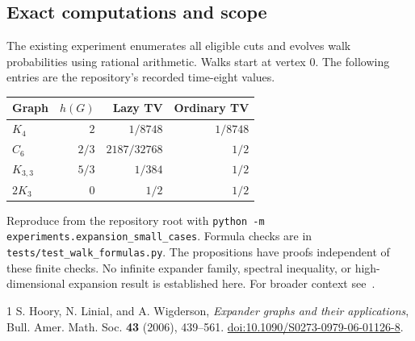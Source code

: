\documentclass[11pt,letterpaper]{article}
\begin{document}
\subsection*{Exact computations and scope}
The existing experiment enumerates all eligible cuts and evolves walk
probabilities using rational arithmetic. Walks start at vertex 0.
The following entries are the repository's recorded time-eight values.
\begin{center}
\begin{tabular}{lrrr}
\toprule
Graph & $h(G)$ & Lazy TV & Ordinary TV\\
\midrule
$K_4$ & $2$ & $1/8748$ & $1/8748$\\
$C_6$ & $2/3$ & $2187/32768$ & $1/2$\\
$K_{3,3}$ & $5/3$ & $1/384$ & $1/2$\\
$2K_3$ & $0$ & $1/2$ & $1/2$\\
\bottomrule
\end{tabular}
\end{center}
Reproduce from the repository root with
\texttt{python -m experiments.expansion\_small\_cases}.
Formula checks are in \texttt{tests/test\_walk\_formulas.py}.
The propositions have proofs independent of these finite checks.
No infinite expander family, spectral inequality, or high-dimensional
expansion result is established here. For broader context see~\cite[Sections 2--3]{HLW}.

\begin{thebibliography}{1}
 S. Hoory, N. Linial, and A. Wigderson,
\emph{Expander graphs and their applications}, Bull. Amer. Math. Soc.
\textbf{43} (2006), 439--561.
\href{https://doi.org/10.1090/S0273-0979-06-01126-8}{doi:10.1090/S0273-0979-06-01126-8}.
\end{thebibliography}
\end{document}
